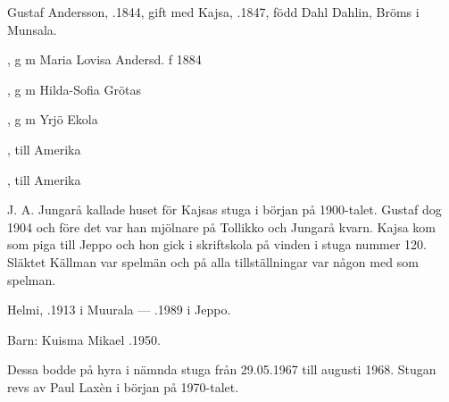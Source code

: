 %
Gustaf Andersson, .1844, gift med Kajsa, .1847, född Dahl Dahlin, Bröms i Munsala.
\begin{jhchildren}
  \item {}, g m Maria Lovisa Andersd. f 1884
  \item {}, g m Hilda-Sofia Grötas
  \item {}, g m Yrjö Ekola
  \item {}
  \item {}, till Amerika
  \item {}, till Amerika
  \item {}
\end{jhchildren}
J. A. Jungarå kallade huset för Kajsas stuga i början på 1900-talet. Gustaf dog 1904 och före det var han mjölnare på Tollikko och Jungarå kvarn. Kajsa kom som piga till Jeppo och hon gick i skriftskola på vinden i stuga nummer 120. Släktet Källman var spelmän och på alla tillställningar var någon med som spelman.



%


%
Helmi, .1913 i Muurala  ---  .1989 i Jeppo.

Barn: Kuisma Mikael .1950.

Dessa bodde på hyra i nämnda stuga från 29.05.1967 till augusti 1968. Stugan revs av Paul Laxèn i början på 1970-talet.



